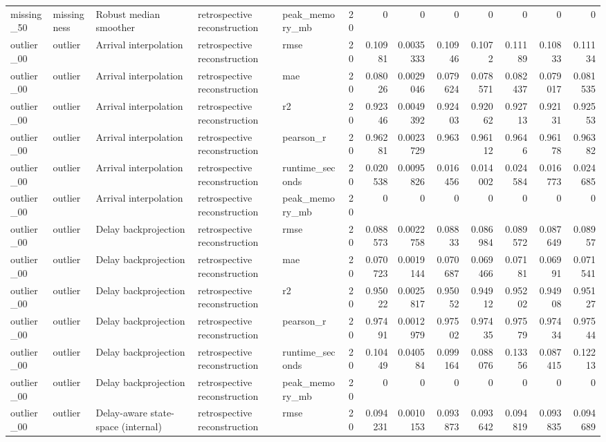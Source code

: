 \begin{table}[!htbp]
{{\begin{tabular}{lllllrrrrrrrr}
missing_50 & missingness & Robust median smoother & retrospective reconstruction & peak_memory_mb & 20 & 0 & 0 & 0 & 0 & 0 & 0 & 0 \\
outlier_00 & outlier & Arrival interpolation & retrospective reconstruction & rmse & 20 & 0.10981 & 0.0035333 & 0.10946 & 0.1072 & 0.11189 & 0.10833 & 0.11134 \\
outlier_00 & outlier & Arrival interpolation & retrospective reconstruction & mae & 20 & 0.08026 & 0.0029046 & 0.079624 & 0.078571 & 0.082437 & 0.079017 & 0.081535 \\
outlier_00 & outlier & Arrival interpolation & retrospective reconstruction & r2 & 20 & 0.92346 & 0.0049392 & 0.92403 & 0.92062 & 0.92713 & 0.92131 & 0.92553 \\
outlier_00 & outlier & Arrival interpolation & retrospective reconstruction & pearson_r & 20 & 0.96281 & 0.0023729 & 0.963 & 0.96112 & 0.9646 & 0.96178 & 0.96382 \\
outlier_00 & outlier & Arrival interpolation & retrospective reconstruction & runtime_seconds & 20 & 0.020538 & 0.0095826 & 0.016456 & 0.014002 & 0.024584 & 0.016773 & 0.024685 \\
outlier_00 & outlier & Arrival interpolation & retrospective reconstruction & peak_memory_mb & 20 & 0 & 0 & 0 & 0 & 0 & 0 & 0 \\
outlier_00 & outlier & Delay backprojection & retrospective reconstruction & rmse & 20 & 0.088573 & 0.0022758 & 0.08833 & 0.086984 & 0.089572 & 0.087649 & 0.08957 \\
outlier_00 & outlier & Delay backprojection & retrospective reconstruction & mae & 20 & 0.070723 & 0.0019144 & 0.070687 & 0.069466 & 0.07181 & 0.06991 & 0.071541 \\
outlier_00 & outlier & Delay backprojection & retrospective reconstruction & r2 & 20 & 0.95022 & 0.0025817 & 0.95052 & 0.94912 & 0.95202 & 0.94908 & 0.95127 \\
outlier_00 & outlier & Delay backprojection & retrospective reconstruction & pearson_r & 20 & 0.97491 & 0.0012979 & 0.97502 & 0.97435 & 0.97579 & 0.97434 & 0.97544 \\
outlier_00 & outlier & Delay backprojection & retrospective reconstruction & runtime_seconds & 20 & 0.10449 & 0.040584 & 0.099164 & 0.088076 & 0.13356 & 0.087415 & 0.12213 \\
outlier_00 & outlier & Delay backprojection & retrospective reconstruction & peak_memory_mb & 20 & 0 & 0 & 0 & 0 & 0 & 0 & 0 \\
outlier_00 & outlier & Delay-aware state-space (internal) & retrospective reconstruction & rmse & 20 & 0.094231 & 0.0010153 & 0.093873 & 0.093642 & 0.094819 & 0.093835 & 0.094689 \\

\end{tabular}}}
\end{table}
